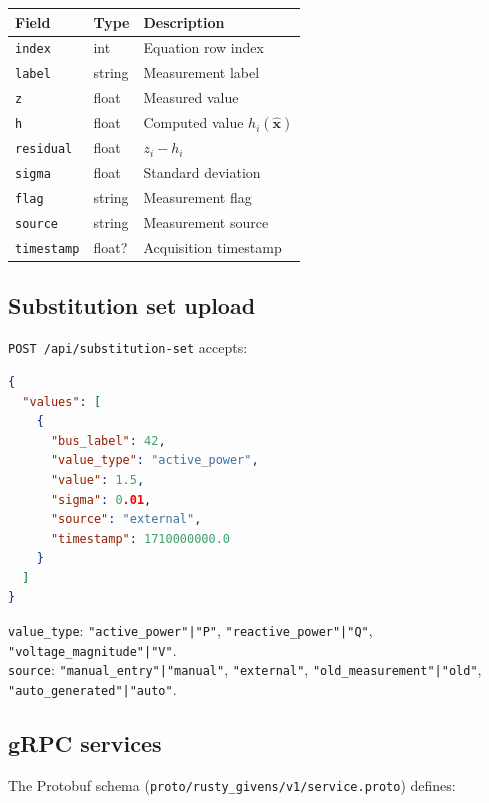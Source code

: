 \documentclass[11pt,a4paper]{article}
\begin{document}
\begin{center}
\small
\begin{tabular}{llp{48mm}}
  \toprule
  \textbf{Field} & \textbf{Type} & \textbf{Description} \\
  \midrule
  \texttt{index}    & int    & Equation row index \\
  \texttt{label}    & string & Measurement label \\
  \texttt{z}        & float  & Measured value \\
  \texttt{h}        & float  & Computed value $h_i(\hat{\mathbf{x}})$ \\
  \texttt{residual} & float  & $z_i - h_i$ \\
  \texttt{sigma}    & float  & Standard deviation \\
  \texttt{flag}     & string & Measurement flag \\
  \texttt{source}   & string & Measurement source \\
  \texttt{timestamp}& float? & Acquisition timestamp \\
  \bottomrule
\end{tabular}
\end{center}

\subsection{Substitution set upload}

\texttt{POST /api/substitution-set} accepts:

\begin{lstlisting}[language=json,caption={Substitution set upload}]
{
  "values": [
    {
      "bus_label": 42,
      "value_type": "active_power",
      "value": 1.5,
      "sigma": 0.01,
      "source": "external",
      "timestamp": 1710000000.0
    }
  ]
}
\end{lstlisting}

\noindent
\texttt{value\_type}: \texttt{"active\_power"|"P"},
\texttt{"reactive\_power"|"Q"}, \texttt{"voltage\_magnitude"|"V"}.\\
\texttt{source}: \texttt{"manual\_entry"|"manual"},
\texttt{"external"}, \texttt{"old\_measurement"|"old"},
\texttt{"auto\_generated"|"auto"}.

\subsection{gRPC services}\label{sec:grpc}

The Protobuf schema (\texttt{proto/rusty\_givens/v1/service.proto})
defines:
\end{document}
